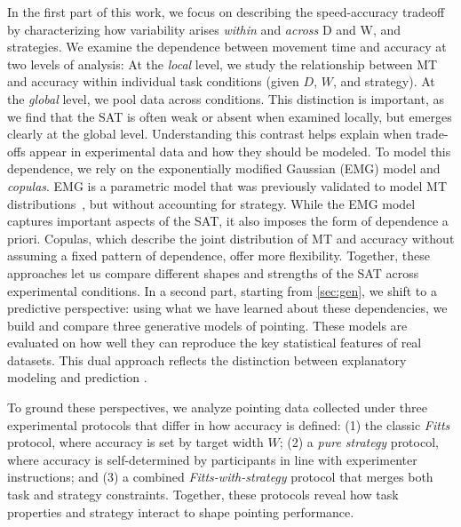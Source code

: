 \documentclass[acmlarge, manuscript,review]{acmart}
\begin{document}
In the first part of this work, we focus on describing the speed-accuracy tradeoff by characterizing how variability arises \textit{within} and \textit{across} D and W, and strategies.
We examine the dependence between movement time and accuracy at two levels of analysis: At the \emph{local} level, we study the relationship between MT and accuracy within individual task conditions (given $D$, $W$, and strategy).
At the \emph{global} level, we pool data across conditions.
This distinction is important, as we find that the SAT is often weak or absent when examined locally, but emerges clearly at the global level.
Understanding this contrast helps explain when trade-offs appear in experimental data and how they should be modeled.
To model this dependence, we rely on the exponentially modified Gaussian (EMG) model and \textit{copulas}. EMG is a parametric model that was previously validated to model MT distributions~\cite{gori2019,gori2018these,li2024,zhao2022}, but without accounting for strategy. While the EMG model captures important aspects of the SAT, it also imposes the form of dependence a priori.
Copulas, which describe the joint distribution of MT and accuracy without assuming a fixed pattern of dependence, offer more flexibility.
Together, these approaches let us compare different shapes and strengths of the SAT across experimental conditions.
In a second part, starting from \autoref{sec:gen}, we shift to a predictive perspective: using what we have learned about these dependencies, we build and compare three generative models of pointing.
These models are evaluated on how well they can reproduce the key statistical features of real datasets.
This dual approach reflects the distinction between explanatory modeling and prediction \cite{shmueli2010}.

To ground these perspectives, we analyze pointing data collected under three experimental protocols that differ in how accuracy is defined:
(1) the classic \emph{Fitts} protocol, where accuracy is set by target width $W$;
(2) a \emph{pure strategy} protocol, where accuracy is self-determined by participants in line with experimenter instructions; and
(3) a combined \emph{Fitts-with-strategy} protocol that merges both task and strategy constraints.
Together, these protocols reveal how task properties and strategy interact to shape pointing performance.
\end{document}
